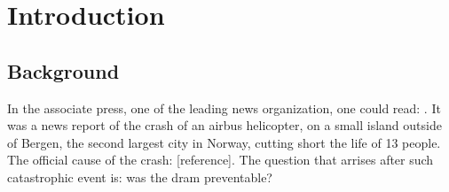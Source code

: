 \documentclass[../Main/thesis.tex]{subfiles}
\begin{document}
\chapter{Introduction}
\label{ch:introduction}

\section{Background}
\label{sec:background}
In the associate press, one of the leading news organization, one could read: .
It was a news report of the crash of an airbus helicopter, on a small island outside of Bergen, the second largest city in Norway, cutting short the life of 13 people. The official cause of the crash:  [reference]. The question that arrises after such catastrophic event is: was the dram preventable?
\end{document}
